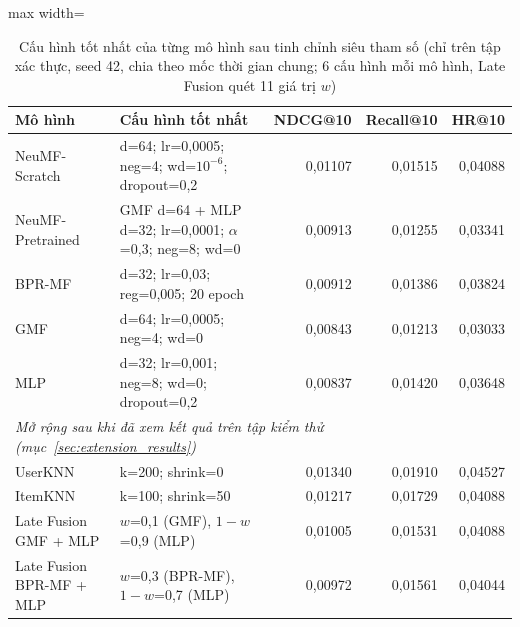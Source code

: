 \begin{table}[htbp]
    \centering\small
    \caption{Cấu hình tốt nhất của từng mô hình sau tinh chỉnh siêu tham số (chỉ trên tập xác thực, seed 42, chia theo mốc thời gian chung; 6 cấu hình mỗi mô hình, Late Fusion quét 11 giá trị $w$)}
    \label{tab:tuning}
    \begin{adjustbox}{max width=\textwidth}
    \begin{tabular}{llrrr}
        \toprule
        Mô hình & Cấu hình tốt nhất & NDCG@10 & Recall@10 & HR@10 \\
        \midrule
        NeuMF-Scratch & d=64; lr=0{,}0005; neg=4; wd=$10^{-6}$; dropout=0{,}2 & 0{,}01107 & 0{,}01515 & 0{,}04088 \\
        NeuMF-Pretrained & GMF d=64 + MLP d=32; lr=0{,}0001; $\alpha$=0{,}3; neg=8; wd=0 & 0{,}00913 & 0{,}01255 & 0{,}03341 \\
        BPR-MF & d=32; lr=0{,}03; reg=0{,}005; 20 epoch & 0{,}00912 & 0{,}01386 & 0{,}03824 \\
        GMF & d=64; lr=0{,}0005; neg=4; wd=0 & 0{,}00843 & 0{,}01213 & 0{,}03033 \\
        MLP & d=32; lr=0{,}001; neg=8; wd=0; dropout=0{,}2 & 0{,}00837 & 0{,}01420 & 0{,}03648 \\
        \midrule\multicolumn{5}{l}{\textit{Mở rộng sau khi đã xem kết quả trên tập kiểm thử (mục~\ref{sec:extension_results})}} \\
        UserKNN & k=200; shrink=0 & 0{,}01340 & 0{,}01910 & 0{,}04527 \\
        ItemKNN & k=100; shrink=50 & 0{,}01217 & 0{,}01729 & 0{,}04088 \\
        Late Fusion GMF + MLP & $w$=0{,}1 (GMF), $1-w$=0{,}9 (MLP) & 0{,}01005 & 0{,}01531 & 0{,}04088 \\
        Late Fusion BPR-MF + MLP & $w$=0{,}3 (BPR-MF), $1-w$=0{,}7 (MLP) & 0{,}00972 & 0{,}01561 & 0{,}04044 \\
        \bottomrule
    \end{tabular}
    \end{adjustbox}
    \par{}
\end{table}
